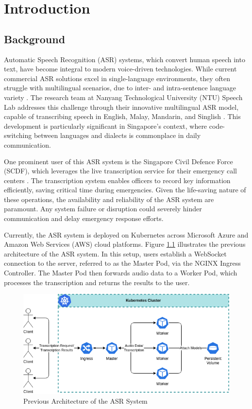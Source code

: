 \chapter{Introduction} \label{chapter:introduction}
\section{Background}

Automatic Speech Recognition (ASR) systems, which convert human speech into text, have become integral to modern voice-driven technologies. While current commercial ASR solutions excel in single-language environments, they often struggle with multilingual scenarios, due to inter- and intra-sentence language variety \cite{code_switching}. The research team at Nanyang Technological University (NTU) Speech Lab addresses this challenge through their innovative multilingual ASR model, capable of transcribing speech in English, Malay, Mandarin, and Singlish \cite{speech_lab,scdf_2}. This development is particularly significant in Singapore's context, where code-switching between languages and dialects is commonplace in daily communication.

One prominent user of this ASR system is the Singapore Civil Defence Force (SCDF), which leverages the live transcription service for their emergency call centers \cite{scdf}. The transcription system enables officers to record key information efficiently, saving critical time during emergencies. Given the life-saving nature of these operations, the availability and reliability of the ASR system are paramount. Any system failure or disruption could severely hinder communication and delay emergency response efforts.

Currently, the ASR system is deployed on Kubernetes across Microsoft Azure and Amazon Web Services (AWS) cloud platforms. Figure \ref{fig:previous_architecture} illustrates the previous architecture of the ASR system. In this setup, users establish a WebSocket connection to the server, referred to as the Master Pod, via the NGINX Ingress Controller. The Master Pod then forwards audio data to a Worker Pod, which processes the transcription and returns the results to the user.

\begin{figure}[!ht]
    \centering
    \includegraphics[width=\textwidth]{figures/previous_architecture.drawio.png}
    \caption{Previous Architecture of the ASR System}
    \label{fig:previous_architecture}
\end{figure}

